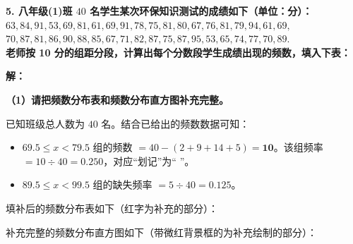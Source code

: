 \textbf{5. 八年级(1)班 $40$ 名学生某次环保知识测试的成绩如下（单位：分）：\\
$63, 84, 91, 53, 69, 81, 61, 69, 91, 78, 75, 81, 80, 67, 76, 81, 79, 94, 61, 69,$ \\
$70, 87, 81, 86, 90, 88, 85, 67, 71, 82, 87, 75, 87, 95, 53, 65, 74, 77, 70, 89.$ \\
老师按 10 分的组距分段，计算出每个分数段学生成绩出现的频数，填入下表：}

\vspace{0.4cm}

\textbf{解：}

\textbf{（1）请把频数分布表和频数分布直方图补充完整。}

\vspace{0.2cm}
已知班级总人数为 $40$ 名。结合已给出的频数数据可知：
\begin{itemize}
  \item $69.5 \leqslant x < 79.5$ 组的频数 $= 40 - (2 + 9 + 14 + 5) = \boldsymbol{10}$。该组频率 $= 10 \div 40 = \boldsymbol{0.250}$，对应“划记”为“\zhengV{} \zhengV{}”。
  \item $89.5 \leqslant x < 99.5$ 组的缺失频率 $= 5 \div 40 = \boldsymbol{0.125}$。
\end{itemize}

填补后的频数分布表如下（红字为补充的部分）：

\vspace{0.4cm}
\begin{center}
\renewcommand{\arraystretch}{1.6}
\end{center}

\vspace{0.6cm}
补充完整的频数分布直方图如下（带微红背景框的为补充绘制的部分）：


